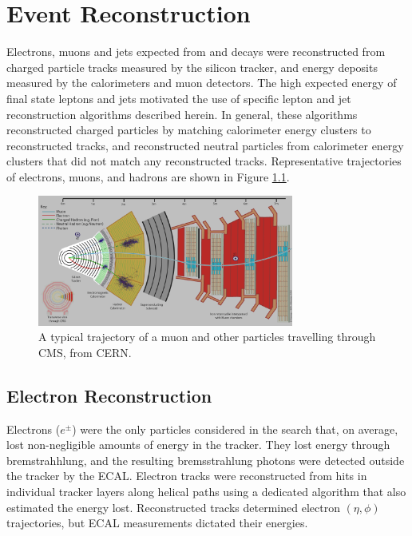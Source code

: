 \chapter{Event Reconstruction}
\label{sec:reco_chapter}

Electrons, muons and jets expected from \WR and \nul decays were reconstructed from charged particle 
tracks measured by the silicon tracker, and energy deposits measured by the calorimeters and muon 
detectors.  The high expected energy of final state leptons and jets motivated the use of specific 
lepton and jet reconstruction algorithms described herein.  In general, these algorithms reconstructed 
charged particles by matching calorimeter energy clusters to reconstructed tracks, and reconstructed 
neutral particles from calorimeter energy clusters that did not match any reconstructed tracks.  
Representative trajectories of electrons, muons, and hadrons are shown in Figure \ref{fig:particleTrajectories}.

\begin{figure}[h]
	\centering
	\includegraphics[width=0.75\textwidth]{figures/flowOfParticlesThroughCMS.png}
	\caption{A typical trajectory of a muon and other particles travelling through CMS, from CERN.}
	\label{fig:particleTrajectories}
\end{figure}


\section{Electron Reconstruction}
\label{sec:eleReco}
Electrons ($e^{\pm}$) were the only particles considered in the \WR search that, on average, lost non-negligible 
amounts of energy in the tracker.  They lost energy through bremstrahhlung, and the resulting bremsstrahlung 
photons were detected outside the tracker by the ECAL.  Electron tracks were reconstructed from hits in 
individual tracker layers along helical paths using a dedicated algorithm that also estimated the energy lost.  
Reconstructed tracks determined electron $(\eta, \phi)$ trajectories, but ECAL measurements dictated their 
energies.

